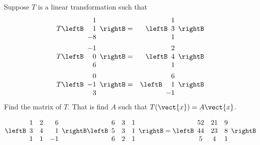 \begin{enumialphparenastyle}
\begin{ex} Suppose $T$ is a linear transformation such that 
\begin{eqnarray*}
T\leftB
\begin{array}{r}
1 \\
1 \\
-8
\end{array}
\rightB &=&\leftB
\begin{array}{r}
1 \\
3 \\
1
\end{array}
\rightB \\
T\leftB
\begin{array}{r}
-1 \\
0 \\
6
\end{array}
\rightB &=&\leftB
\begin{array}{r}
2 \\
4 \\
1
\end{array}
\rightB \\
T\leftB
\begin{array}{r}
0 \\
-1 \\
3
\end{array}
\rightB &=&\leftB
\begin{array}{r}
6 \\
1 \\
-1
\end{array}
\rightB
\end{eqnarray*}
Find the matrix of $T$. That is find $A$ such that $T(\vect{x})=A\vect{x}$. \vspace{1mm}
\begin{sol}
\[
\leftB
\begin{array}{rrr}
1 & 2 & 6 \\
3 & 4 & 1 \\
1 & 1 & -1
\end{array}
\rightB \leftB
\begin{array}{ccc}
6 & 3 & 1 \\
5 & 3 & 1 \\
6 & 2 & 1
\end{array}
\rightB =\leftB
\begin{array}{ccc}
52 & 21 & 9 \\
44 & 23 & 8 \\
5 & 4 & 1
\end{array}
\rightB
\]
\end{sol}
\end{ex}


\end{enumialphparenastyle}
